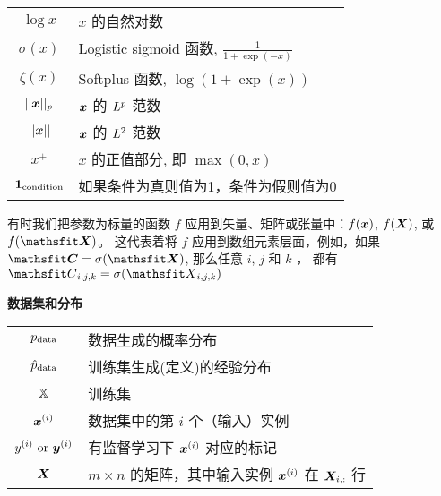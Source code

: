 \begin{minipage}{\textwidth}
\begin{tabular}{cp{3.25in}}
$\displaystyle \log x$ & $x$ 的自然对数 \\
$\displaystyle \sigma(x)$ & Logistic sigmoid 函数, $\displaystyle \frac{1} {1 + \exp(-x)}$ \\
$\displaystyle \zeta(x)$ & Softplus 函数, $\log(1 + \exp(x))$ \\
$\displaystyle || {\bm{x}} ||_p $ & ${\bm{x}}$ 的 $L^p$ 范数\\
$\displaystyle || {\bm{x}} || $ & ${\bm{x}}$ 的 $L^2$ 范数\\
$\displaystyle x^+$ & $x$ 的正值部分, 即 $\max(0,x)$\\
$\displaystyle \bm{1}_\mathrm{condition}$ & 如果条件为真则值为1，条件为假则值为0 \\
\end{tabular}
\egroup
{}
\end{minipage}

有时我们把参数为标量的函数 $f$ 应用到矢量、矩阵或张量中：$f({\bm{x}})$, $f({\bm{X}})$, 或 $f(\tX)$。
这代表着将 $f$ 应用到数组元素层面，例如，如果 $\tC = \sigma(\tX)$, 那么任意 $i$, $j$ 和 $k$ ，
都有 $\etC_{i,j,k} = \sigma(\etX_{i,j,k})$


\vspace{\notationgap}
\begin{minipage}{\textwidth}
\centerline{\bf 数据集和分布}
\bgroup
\def\arraystretch{1.5}
\begin{tabular}{cp{3.25in}}
$\displaystyle p_{\rm{data}}$ & 数据生成的概率分布\\
$\displaystyle \hat{p}_{\rm{data}}$ & 训练集生成(定义)的经验分布\\
$\displaystyle {\mathbb{X}}$ & 训练集\\
$\displaystyle {\bm{x}}^{(i)}$ & 数据集中的第 $i$ 个（输入）实例\\
$\displaystyle y^{(i)}\text{ or }{\bm{y}}^{(i)}$ & 有监督学习下 ${\bm{x}}^{(i)}$ 对应的标记\\
$\displaystyle {\bm{X}}$ & $m \times n$ 的矩阵，其中输入实例 ${\bm{x}}^{(i)}$ 在 ${\bm{X}}_{i,:}$ 行\\
\end{tabular}
\egroup
\end{minipage}

\clearpage

